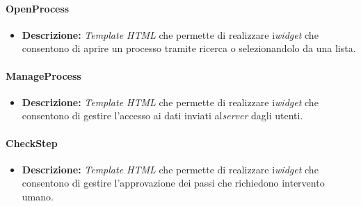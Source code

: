 \paragraph{OpenProcess}
\begin{itemize}
\item \textbf{Descrizione:} \textit{Template HTML} che permette di realizzare i\textit{widget} che consentono di aprire un processo tramite ricerca o selezionandolo da una lista.
\end{itemize}

\paragraph{ManageProcess}
\begin{itemize}
\item \textbf{Descrizione:} \textit{Template HTML} che permette di realizzare i\textit{widget} che consentono di gestire l'accesso ai dati inviati al\textit{server} dagli utenti.
\end{itemize}

\paragraph{CheckStep}
\begin{itemize}
\item \textbf{Descrizione:} \textit{Template HTML} che permette di realizzare i\textit{widget} che consentono di gestire l'approvazione dei passi che richiedono intervento umano.
\end{itemize}

